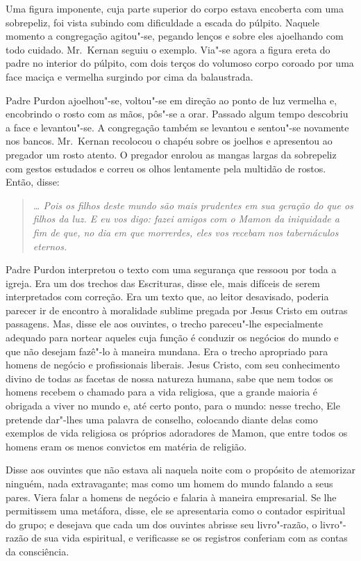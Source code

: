 Uma figura imponente, cuja parte superior do corpo estava encoberta com uma
sobrepeliz, foi vista subindo com dificuldade a escada do púlpito.  Naquele
momento a congregação agitou"-se, pegando lenços e sobre eles ajoelhando com
todo cuidado.  Mr.~Kernan seguiu o exemplo.  Via"-se agora a figura ereta do
padre no interior do púlpito, com dois terços do volumoso corpo coroado por uma
face maciça e vermelha surgindo por cima da balaustrada.

Padre Purdon ajoelhou"-se, voltou"-se em direção ao ponto de luz vermelha e,
encobrindo o rosto com as mãos, pôs"-se a orar.  Passado algum tempo descobriu a
face e levantou"-se.  A congregação também se levantou e sentou"-se novamente nos
bancos.  Mr.~Kernan recolocou o chapéu sobre os joelhos e apresentou ao
pregador um rosto atento.  O pregador enrolou as mangas largas da sobrepeliz
com gestos estudados e correu os olhos lentamente pela multidão de rostos.
Então, disse:

\begin{quote}\itshape
\ldots{} Pois os filhos deste mundo são mais prudentes em sua
geração do que os filhos da luz.  E eu vos digo: fazei amigos com o
Mamon da iniquidade a fim de que, no dia em que morrerdes, eles vos
recebam nos tabernáculos eternos.
\end{quote}

Padre Purdon interpretou o texto com uma segurança que ressoou por toda a
igreja.  Era um dos trechos das Escrituras, disse ele, mais difíceis de serem
interpretados com correção.  Era um texto que, ao leitor desavisado, poderia
parecer ir de encontro à moralidade sublime pregada por Jesus Cristo em outras
passagens.  Mas, disse ele aos ouvintes, o trecho pareceu"-lhe especialmente
adequado para nortear aqueles cuja função é conduzir os negócios do mundo e que
não desejam fazê"-lo à maneira mundana.  Era o trecho apropriado para homens de
negócio e profissionais liberais.  Jesus Cristo, com seu conhecimento divino de
todas as facetas de nossa natureza humana, sabe que nem todos os homens recebem
o chamado para a vida religiosa, que a grande maioria é obrigada a viver no
mundo e, até certo ponto, para o mundo: nesse trecho, Ele pretende dar"-lhes uma
palavra de conselho, colocando diante delas como exemplos de vida religiosa os
próprios adoradores de Mamon, que entre todos os homens eram os menos convictos
em matéria de religião.

Disse aos ouvintes que não estava ali naquela noite com o propósito de
atemorizar ninguém, nada extravagante; mas como um homem do mundo falando a
seus pares.  Viera falar a homens de negócio e falaria à maneira empresarial.
Se lhe permitissem uma metáfora, disse, ele se apresentaria como o contador
espiritual do grupo; e desejava que cada um dos ouvintes abrisse seu
livro"-razão, o livro"-razão de sua vida espiritual, e verificasse se os
registros conferiam com as contas da consciência.

